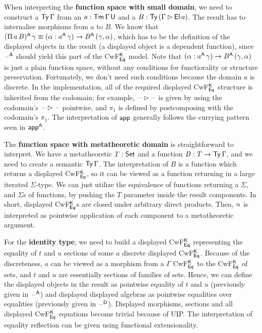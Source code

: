 \documentclass[acmsmall,review,anonymous]{acmart}\settopmatter{printfolios=true,printccs=false,printacmref=false}
\begin{document}
When interpreting the \textbf{function space with small domain}, we
need to construct a $\mathsf{Ty}\,\Gamma$ from an $a : \mathsf{Tm}\,\Gamma\,\mathsf{U}$ and a
$B : \mathsf{Ty}\,(\Gamma\rhd\mathsf{El}\,a)$. The result has to internalise morphisms
from $a$ to $B$. We know that $(\Pi\,a\,B)^{\mathsf{A}}\,\gamma \equiv
(\alpha:a^{\mathsf{A}}\,\gamma)\rightarrow B^{\mathsf{A}}\,(\gamma, \alpha)$, which has to be the
definition of the displayed objects in the result (a displayed object
is a dependent function), since $\mathord{\hspace{1pt}\text{--}\hspace{1pt}}^{\mathsf{A}}$ should yield this part of
the CwF$^{\mathsf{K}}_{\mathsf{Eq}}$ model. Note that $(\alpha:a^{\mathsf{A}}\,\gamma)\rightarrow
B^{\mathsf{A}}\,(\gamma, \alpha)$ is just a plain function space, without any
conditions for functiorality or structure preservation. Fortunately,
we don't need such conditions because the domain $a$ is discrete. In
the implementation, all of the required displayed CwF$^{\mathsf{K}}_{\mathsf{Eq}}$
structure is inherited from the codomain; for example,
$\mathord{\hspace{1pt}\text{--}\hspace{1pt}}\rhd\mathord{\hspace{1pt}\text{--}\hspace{1pt}}$ is given by using the codomain's $\mathord{\hspace{1pt}\text{--}\hspace{1pt}}\rhd\mathord{\hspace{1pt}\text{--}\hspace{1pt}}$
pointwise, and $\pi_1$ is defined by postcomposing with the codomain's
$\pi_1$. The interpretation of $\mathsf{app}$ generally follows the currying
pattern seen in $\mathsf{app}^{\mathsf{A}}$.

The \textbf{function space with metatheoretic domain} is straightforward
to interpret. We have a metatheoretic $T : \mathsf{Set}$ and a function $B : T
\rightarrow \mathsf{Ty}\,\Gamma$, and we need to create a semantic $\mathsf{Ty}\,\Gamma$. The
interpretation of $B$ is a function which returns a displayed
CwF$^{\mathsf{K}}_{\mathsf{Eq}}$, so it can be viewed as a function returning in a large
iterated $\Sigma$-type. We can just utilize the equivalence of
functions returning a $\Sigma$, and $\Sigma$s of functions, by pushing
the $T$ parameter inside the result components. In short, displayed
CwF$^{\mathsf{K}}_{\mathsf{Eq}}$s are closed under arbitrary direct products. Then,
$\mathop{{\scriptstyle @}}$ is interpreted as pointwise application of each component to a
metatheoretic argument.

For the \textbf{identity type}, we need to build a displayed
CwF$^{\mathsf{K}}_{\mathsf{Eq}}$ representing the equality of $t$ and $u$ sections of
some $a$ discrete displayed CwF$^{\mathsf{K}}_{\mathsf{Eq}}$. Because of the
discreteness, $a$ can be viewed as a morphism from a $\Gamma$
CwF$^{\mathsf{K}}_{\mathsf{Eq}}$ to the CwF$^{\mathsf{K}}_{\mathsf{Eq}}$ of sets, and $t$ and $u$ are
essentially sections of families of sets. Hence, we can define the
displayed objects in the result as pointwise equality of $t$ and $u$
(previously given in $\mathord{\hspace{1pt}\text{--}\hspace{1pt}}^{\mathsf{A}}$) and displayed displayed algebras as
pointwise equalities over equalities (previously given in
$\mathord{\hspace{1pt}\text{--}\hspace{1pt}}^{\mathsf{D}}$). Displayed morphisms, sections and all displayed
CwF$^{\mathsf{K}}_{\mathsf{Eq}}$ equations become trivial because of UIP. The
interpretation of equality reflection can be given using functional
extensionality.
\end{document}
